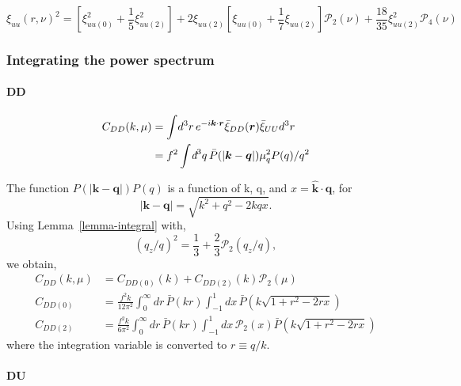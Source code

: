 \documentclass[a4paper,11pt, fleqn]{article}
\newcommand{\dbar}{\textit{\dj}}
\begin{document}
\begin{equation}
  \xi_{uu}(r, \nu)^2
  = \left[\xi_{uu(0)}^2 + \frac{1}{5} \xi_{uu(2)}^2 \right]
    + 2 \xi_{uu(2)} \left[
        \xi_{uu(0)} + \frac{1}{7} \xi_{uu(2)} \right]\mathcal{P}_2(\nu)
    +\frac{18}{35} \xi_{uu(2)}^2 \mathcal{P}_4(\nu)
\end{equation}

%
%
\clearpage
\subsubsection{Integrating the power spectrum}

\paragraph{DD}

\begin{align}
  C_{DD}(k, \mu) &=
    \int\! d^3 r \, e^{-i\bm{k}\cdot\bm{r}}
    \bar{\xi}_{DD}(\bm{r}) \bar{\xi}_{UU}d^3 r\\
  &= f^2 \int \! \dbar^3 q \, \bar{P}(|\bm{k} - \bm{q}|) \mu_q^2 P(q)/q^2
\end{align}

The function $P(|\bm{k} - \bm{q}|)P(q)$ is a function of k, q, and $x
= \bm{\hat{k}}\cdot\bm{q}$, for
\begin{equation}
  |\bm{k} - \bm{q}| = \sqrt{k^2 + q^2 - 2kqx}.
\end{equation}
Using Lemma~\ref{lemma-integral} with,
\begin{equation}
  (q_z/q)^2 = \frac{1}{3} + \frac{2}{3} \mathcal{P}_2(q_z/q),
\end{equation}
we obtain,
\begin{align}
  C_{DD}(k, \mu) &= C_{DD(0)}(k) +
                   C_{DD(2)}(k) \mathcal{P}_2(\mu)\\
  C_{DD(0)} &= \frac{f^2 k}{12\pi^2}
                \int_0^\infty \! dr \, \bar{P}(kr)
                \int_{-1}^1 \! dx \, 
                \bar{P}\left(k\sqrt{1 + r^2 - 2rx}\right)\\
  C_{DD(2)} &= \frac{f^2 k}{6\pi^2}
                \int_0^\infty \! dr \, \bar{P}(kr)
                \int_{-1}^1 \! dx \, \mathcal{P}_2(x)
                \bar{P}\left(k\sqrt{1 + r^2 - 2rx}\right)
\end{align}
where the integration variable is converted to $r \equiv q/k$.

\clearpage
\paragraph{DU}
\end{document}
